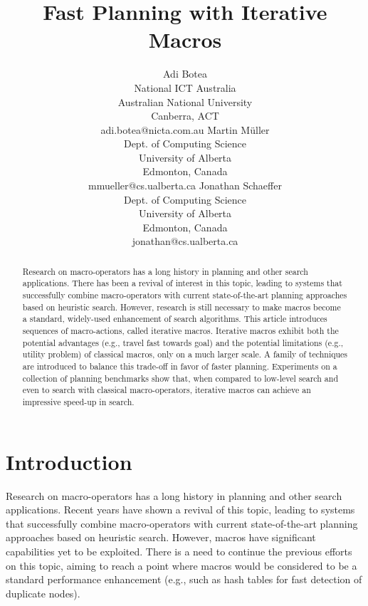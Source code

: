 \documentclass{article}
\date{}
\begin{document}
\title{Fast Planning with Iterative Macros}
\author{
Adi Botea\\
National ICT Australia\\
Australian National University\\
Canberra, ACT\\
adi.botea@nicta.com.au
\And
Martin M\"uller\\
Dept. of Computing Science\\
University of Alberta\\
Edmonton, Canada\\
mmueller@cs.ualberta.ca
\And
Jonathan Schaeffer\\
Dept. of Computing Science\\
University of Alberta\\
Edmonton, Canada\\
jonathan@cs.ualberta.ca
}
\maketitle

\begin{abstract}
Research on macro-operators has a long history in planning and
other search applications.
There has been a revival of interest in this topic, leading to systems
that successfully combine macro-operators with current state-of-the-art
planning approaches based on heuristic search.
However, research is still necessary to make macros become a standard,
widely-used enhancement of search algorithms.
This article introduces
sequences of macro-actions, called iterative macros.
Iterative macros exhibit both the potential advantages
(e.g., travel fast towards goal)
and the potential limitations (e.g., utility problem) of classical macros,
only on a much larger scale.
A family of techniques  are introduced to balance
this trade-off in favor of faster planning.
Experiments on a collection of planning benchmarks show that, when
compared to low-level search and even to search with classical macro-operators,
iterative macros can achieve an impressive speed-up in search.
\end{abstract}

\section{Introduction}

Research on macro-operators has a long history in planning and
other search applications.
Recent years have shown a revival of this topic, leading to systems
that successfully combine macro-operators with current state-of-the-art
planning approaches based on heuristic search.
However, macros have significant capabilities yet to be exploited.
There is a need to continue the previous efforts on this topic, 
aiming to reach a point where macros would be considered to be a
standard performance enhancement
(e.g., such as hash tables for fast detection of duplicate nodes).
\end{document}

